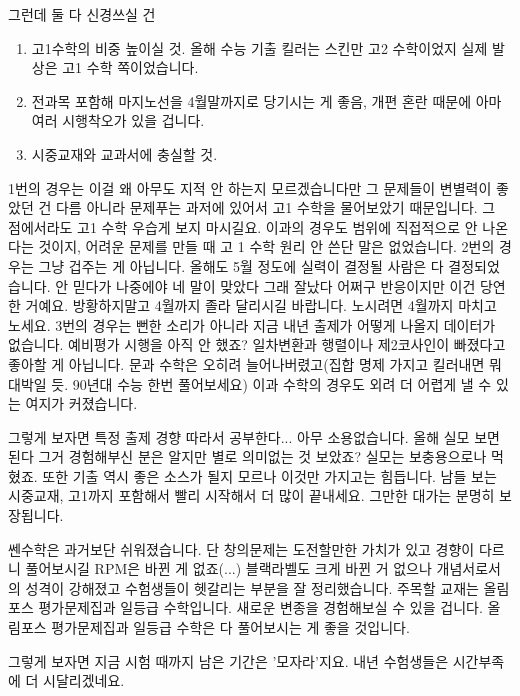 그런데 둘 다 신경쓰실 건
\vspace{5mm}
\begin{enumerate}
    \item 고1수학의 비중 높이실 것. 올해 수능 기출 킬러는 스킨만 고2 수학이었지 실제 발상은 고1 수학 쪽이었습니다.
    \item 전과목 포함해 마지노선을 4월말까지로 당기시는 게 좋음, 개편 혼란 때문에 아마 여러 시행착오가 있을 겁니다.
    \item 시중교재와 교과서에 충실할 것.
\end{enumerate}
\vspace{5mm}

1번의 경우는 이걸 왜 아무도 지적 안 하는지 모르겠습니다만 그 문제들이 변별력이 좋았던 건
다름 아니라 문제푸는 과저에 있어서 고1 수학을 물어보았기 때문입니다. 그 점에서라도 고1 수학 우습게 보지 마시길요.
이과의 경우도 범위에 직접적으로 안 나온다는 것이지, 어려운 문제를 만들 때 고 1 수학 원리 안 쓴단 말은 없었습니다.
2번의 경우는 그냥 겁주는 게 아닙니다. 올해도 5월 정도에 실력이 결정될 사람은 다 결정되었습니다.
안 믿다가 나중에야 네 말이 맞았다 그래 잘났다 어쩌구 반응이지만 이건 당연한 거예요.
방황하지말고 4월까지 졸라 달리시길 바랍니다. 노시려면 4월까지 마치고 노세요.
3번의 경우는 뻔한 소리가 아니라 지금 내년 출제가 어떻게 나올지 데이터가 없습니다. 예비평가 시행을 아직 안 했죠?
일차변환과 행렬이나 제2코사인이 빠졌다고 좋아할 게 아닙니다.
문과 수학은 오히려 늘어나버렸고(집합 명제 가지고 킬러내면 뭐 대박일 듯. 90년대 수능 한번 풀어보세요)
이과 수학의 경우도 외려 더 어렵게 낼 수 있는 여지가 커졌습니다.
\vspace{5mm}

그렇게 보자면 특정 출제 경향 따라서 공부한다... 아무 소용없습니다.
올해 실모 보면 된다 그거 경험해부신 분은 알지만 별로 의미없는 것 보았죠? 실모는 보충용으로나 먹혔죠.
또한 기출 역시 좋은 소스가 될지 모르나 이것만 가지고는 힘듭니다.
남들 보는 시중교재, 고1까지 포함해서 빨리 시작해서 더 많이 끝내세요. 그만한 대가는 분명히 보장됩니다.
\vspace{5mm}

쎈수학은 과거보단 쉬워졌습니다. 단 창의문제는 도전할만한 가치가 있고 경향이 다르니 풀어보시길
RPM은 바뀐 게 없죠(...)
블랙라벨도 크게 바뀐 거 없으나 개념서로서의 성격이 강해졌고 수험생들이 헷갈리는 부분을 잘 정리했습니다.
주목할 교재는 올림포스 평가문제집과 일등급 수학입니다. 새로운 변종을 경험해보실 수 있을 겁니다.
올림포스 평가문제집과 일등급 수학은 다 풀어보시는 게 좋을 것입니다.
\vspace{5mm}

그렇게 보자면 지금 시험 때까지 남은 기간은 '모자라'지요.
내년 수험생들은 시간부족에 더 시달리겠네요.
\vspace{5mm}

